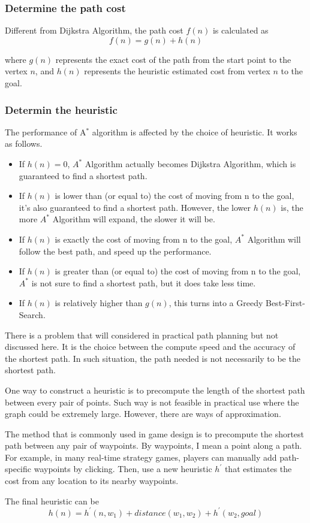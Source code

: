 \documentclass[catalog.tex]{subfiles}
\begin{document}
\subsubsection*{Determine the path cost}
\par Different from Dijkstra Algorithm, the path cost $f(n)$ is calculated as
$$
	f(n)=g(n)+h(n)
$$
\par where $g(n)$ represents the exact cost of the path from the start point to the vertex $n$, and $h(n)$ represents the heuristic estimated cost from vertex $n$ to the goal.
\subsubsection*{Determin the heuristic}
\par The performance of A$^*$ algorithm is affected by the choice of heuristic. It works as follows.
\begin{itemize}
	\item If $h(n) = 0$, $A^*$ Algorithm actually becomes Dijkstra Algorithm, which is guaranteed to find a shortest path.
	\item If $h(n)$ is lower than (or equal to) the cost of moving from n to the goal, it's also guaranteed to find a shortest path. However, the lower $h(n)$ is, the more $A^*$ Algorithm will expand, the slower it will be.
	\item If $h(n)$ is exactly the cost of moving from n to the goal, $A^*$ Algorithm will follow the best path, and speed up the performance.
	\item If $h(n)$ is greater than (or equal to) the cost of moving from n to the goal, $A^*$ is not sure to find a shortest path, but it does take less time.
	\item If $h(n)$ is relatively higher than $g(n)$, this turns into a Greedy Best-First-Search.
\end{itemize}
\par There is a problem that will considered in practical path planning but not discussed here. It is the choice between the compute speed and the accuracy of the shortest path. In such situation, the path needed is not necessarily to be the shortest path.
\par One way to construct a heuristic is to precompute the length of the shortest path between every pair of points. Such way is not feasible in practical use where the graph could be extremely large. However, there are ways of approximation.
\par The method that is commonly used in game design is to precompute the shortest path between any pair of waypoints. By waypoints, I mean a point along a path. For example, in many real-time strategy games, players can manually add path-specific waypoints by clicking. Then, use a new heuristic $h^{'}$ that estimates the cost from any location to its nearby waypoints.
\par The final heuristic can be
$$
h(n)=h^{'}(n,w_1)+distance(w_1,w_2)+h^{'}(w_2,goal)
$$
\end{document}
